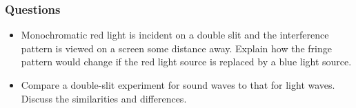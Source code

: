 \documentclass[]{beamer}
\begin{document}


\begin{frame}

\frametitle{Questions}


\begin{itemize}

\item Monochromatic red light is incident on a double slit and the
interference pattern is viewed on a screen some distance
away. Explain how the fringe pattern would change if the
red light source is replaced by a blue light source.

\pause

\item Compare a double-slit experiment for sound waves to that
for light waves. Discuss the similarities and differences.


\end{itemize}


  \end{frame}





























 
\end{document}
